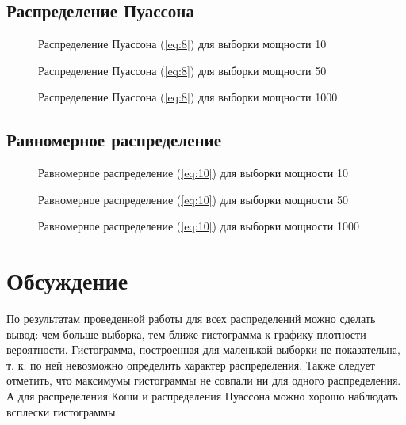 \documentclass{article}
\begin{document}
\newpage
\subsection{Распределение Пуассона}
\begin{figure}[h]
\caption{Распределение Пуассона (\ref{eq:8}) для выборки мощности 10}
\end{figure}
\begin{figure}[h]
\caption{Распределение Пуассона (\ref{eq:8}) для выборки мощности 50}
\end{figure}
\begin{figure}[h]
\caption{Распределение Пуассона (\ref{eq:8}) для выборки мощности 1000}
\end{figure}

\newpage
\subsection{Равномерное распределение}
\begin{figure}[h]
\caption{Равномерное распределение (\ref{eq:10}) для выборки мощности 10}
\end{figure}
\begin{figure}[h]
\caption{Равномерное распределение (\ref{eq:10}) для выборки мощности 50}
\end{figure}
\begin{figure}[h]
\caption{Равномерное распределение (\ref{eq:10}) для выборки мощности 1000}
\end{figure}

\newpage
\section{Обсуждение}
По результатам проведенной работы для всех распределений можно сделать вывод: чем больше выборка, тем ближе гистограмма к графику плотности вероятности. Гистограмма, построенная для маленькой выборки не показательна, т. к. по ней невозможно определить характер распределения. Также следует отметить, что максимумы гистограммы не совпали ни для одного распределения. А для распределения Коши и распределения Пуассона можно хорошо наблюдать всплески гистограммы.
\end{document}
